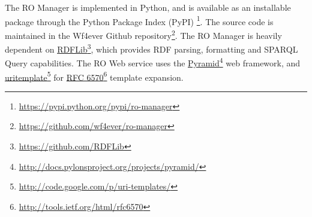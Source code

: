 The RO Manager is implemented in Python, and is available as an installable package through the Python Package Index (PyPI) \footnote{\url{https://pypi.python.org/pypi/ro-manager}}. The source code is maintained in the Wf4ever Github repository\footnote{\url{https://github.com/wf4ever/ro-manager}}.
The RO Manager is heavily dependent on \href{https://github.com/RDFLib}{RDFLib}\footnote{\href{https://github.com/RDFLib}{https://github.com/RDFLib}}, which provides RDF parsing, formatting and SPARQL Query capabilities. The RO Web service uses the \href{http://docs.pylonsproject.org/projects/pyramid/}{Pyramid}\footnote{\href{http://docs.pylonsproject.org/projects/pyramid/}{http://docs.pylonsproject.org/projects/pyramid/}} web framework, and \href{http://code.google.com/p/uri-templates/}{uritemplate}\footnote{\href{http://code.google.com/p/uri-templates/}{http://code.google.com/p/uri-templates/}} for \href{http://tools.ietf.org/html/rfc6570}{RFC 6570}\footnote{\href{http://tools.ietf.org/html/rfc6570}{http://tools.ietf.org/html/rfc6570}} template expansion.


